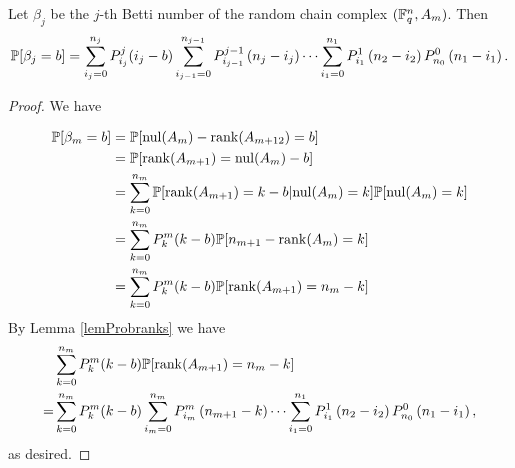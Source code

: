 \begin{theorem} Let $\beta_j$ be the $j$-th Betti number of the random chain complex $(\mathbb{F}_q^{n} , A_m)$. Then
	\[    
    \mathbb{P}[\beta_j = b] = \sum_{i_j=0}^{n_{j}} P_{i_j}^{j}(i_j-b)
    \sum_{i_{j-1}=0}^{n_{j-1}} P_{i_{j-1}}^{j-1}\left(n_{j} -i_j\right)
		\cdots
	\sum_{i_1 = 0}^{n_1} P_{i_1}^1\left(n_2 - i_2\right) P_{n_0}^0 \left(n_1 - i_1\right).
    \]
\end{theorem}
\begin{proof}
We have

\begin{align*}
  \mathbb{P}[\beta_{m} = b] 
   &= \mathbb{P}[\mathrm{nul}(A_{m}) - \operatorname{\mathrm{rank}}(A_{m+12}) = b]\\
   &= \mathbb{P}[\operatorname{\mathrm{rank}}(A_{m+1}) = \mathrm{nul}(A_{m}) - b]\\
   &= \sum_{k=0}^{n_{m}}\mathbb{P}[\operatorname{\mathrm{rank}}(A_{m+1}) = k - b| \mathrm{nul}(A_{m})=k] \mathbb{P}[\mathrm{nul}(A_{m}) = k]\\
   &= \sum_{k=0}^{n_{m}} P_{k}^{m}(k-b)\mathbb{P}[n_{m+1} - \operatorname{\mathrm{rank}}(A_{m}) = k]\\
   &= \sum_{k=0}^{n_{m}} P_{k}^{m}(k-b)\mathbb{P}[\operatorname{\mathrm{rank}}(A_{m+1}) = n_{m} - k]\\ 
\end{align*}
By Lemma \ref{lemProbranks} we have
\begin{align*}
 & \sum_{k=0}^{n_{m}} P_{k}^{m}(k-b)\mathbb{P}[\operatorname{\mathrm{rank}}(A_{m+1}) = n_{m} - k] \\
=& \sum_{k=0}^{n_{m}} P_{k}^{m}(k-b)\sum_{i_m=0}^{n_m} P_{i_m}^{m}\left(n_{m+1} -k\right)
		\cdots
	\sum_{i_1 = 0}^{n_1} P_{i_1}^1\left(n_2 - i_2\right) P_{n_0}^0 \left(n_1 - i_1\right), 
\end{align*}
as desired.
\end{proof}

